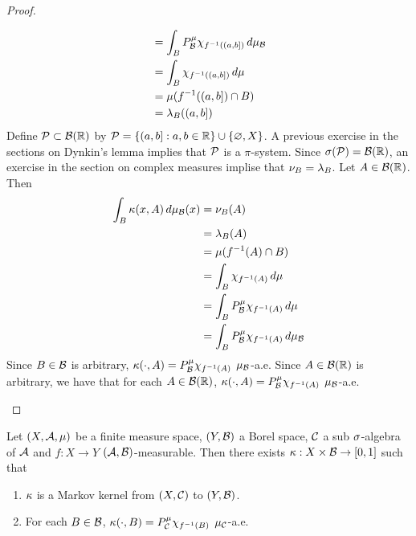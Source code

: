 \documentclass{book}
\begin{document}
\begin{proof}
\begin{enumerate}
\begin{align*}
				& = \int_{B} P^{\mu}_{\mathcal{B}}\chi_{f^{-1}((a, b])} \, d \mu_{\mathcal{B}} \\
				& = \int_{B} \chi_{f^{-1}((a, b])} \, d \mu  \\
				& = \mu(f^{-1}((a, b]) \cap B) \\
				& = \lambda_{B}((a,b])
			\end{align*}
			Define $\mathcal{P} \subset \mathcal{B}(\mathbb{R})$ by $\mathcal{P} = \{(a,b]: a,b \in \mathbb{R}\} \cup \{\varnothing, X\}$. A previous exercise in the sections on Dynkin's lemma implies that $\mathcal{P}$ is a $\pi$-system. Since $\sigma(\mathcal{P}) = \mathcal{B}(\mathbb{R})$, an exercise in the section on complex measures implise that $\nu_{B} = \lambda_{B}$. Let $A \in \mathcal{B}(\mathbb{R})$. Then 
			\begin{align*}
				\int_B \kappa(x, A) \, d \mu_{\mathcal{B}}(x) 
				& = \nu_B(A) \\
				& = \lambda_{B}(A) \\
				& =  \mu(f^{-1}(A) \cap B) \\
				& = \int_B \chi_{f^{-1}(A)} \, d \mu \\
				& = \int_B P^{\mu}_{\mathcal{B}} \chi_{f^{-1}(A)} \, d \mu \\
				& = \int_B P^{\mu}_{\mathcal{B}} \chi_{f^{-1}(A)} \, d \mu_{\mathcal{B}} \\
			\end{align*}
			Since $B \in \mathcal{B}$ is arbitrary, $\kappa(\cdot, A) = P^{\mu}_{\mathcal{B}} \chi_{f^{-1}(A)}$ $\mu_{\mathcal{B}}$-a.e. Since $A \in \mathcal{B}(\mathbb{R})$ is arbitrary, we have that for each $A \in \mathcal{B}(\mathbb{R})$, $\kappa(\cdot, A) = P^{\mu}_{\mathcal{B}} \chi_{f^{-1}(A)}$ $\mu_{\mathcal{B}}$-a.e.
		\end{enumerate}
	\end{proof}

	\begin{ex}
			Let $(X, \mathcal{A}, \mu)$ be a finite measure space, $(Y, \mathcal{B})$ a Borel space, $\mathcal{C}$ a sub $\sigma$-algebra of $\mathcal{A}$ and $f: X \rightarrow Y$ $(\mathcal{A}, \mathcal{B})$-measurable. Then there exists $\kappa: X \times \mathcal{B} \rightarrow [0,1]$ such that 
		\begin{enumerate}
			\item $\kappa$ is a Markov kernel from $(X, \mathcal{C})$ to $(Y, \mathcal{B})$.
			\item For each $B \in \mathcal{B}$, $\kappa(\cdot, B) = P^{\mu}_{\mathcal{C}}\chi_{f^{-1}(B)}$ $\mu_{\mathcal{C}}$-a.e.
		\end{enumerate}
	\end{ex}
\end{document}
